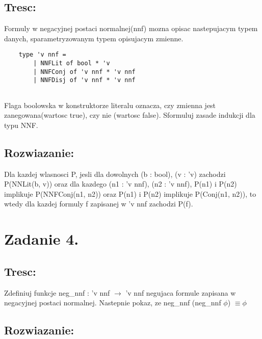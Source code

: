 \documentclass{article}
\begin{document}
\subsection{Tresc:}

Formuly w negacyjnej postaci normalnej(nnf) mozna opisac nastepujacym typem danych, sparametryzowanym typem opisujacym zmienne.

\begin{lstlisting}
    type 'v nnf =
        | NNFLit of bool * 'v
        | NNFConj of 'v nnf * 'v nnf
        | NNFDisj of 'v nnf * 'v nnf
    
\end{lstlisting}

Flaga boolowska w konstruktorze literalu oznacza, czy zmienna jest zanegowana(wartosc true), czy nie (wartosc false). Sformuluj zasade indukcji dla typu NNF.

\subsection{Rozwiazanie:}

\begin{tcolorbox}[colback=white!90!blue,colframe=black!35!blue,title=Zasada indukcji dla typu 'v nnf]

    Dla kazdej wlasnosci P, jesli dla dowolnych (b : bool), (v : 'v) zachodzi P(NNLit(b, v)) oraz dla kazdego (n1 : 'v nnf), (n2 : 'v nnf), P(n1) i P(n2) implikuje P(NNFConj(n1, n2)) oraz P(n1) i P(n2) implikuje P(Conj(n1, n2)), to wtedy dla kazdej formuly f zapisanej w 'v nnf zachodzi P(f).
 
\end{tcolorbox}

\section{Zadanie 4.}

\subsection{Tresc:}

Zdefiniuj funkcje neg\_nnf : 'v nnf $\rightarrow$ 'v nnf negujaca formule zapisana w negacyjnej postaci normalnej. Nastepnie pokaz, ze neg\_nnf (neg\_nnf $\phi$) $\equiv \phi$ 

\subsection{Rozwiazanie:}
\end{document}
